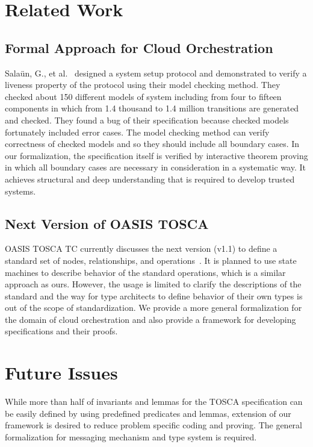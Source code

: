 \documentclass[12pt]{report}
\begin{document}
\section{Related Work}
\subsection{Formal Approach for Cloud Orchestration}
Sala{\"u}n, G., et
al.~\cite{EtcheversCBP11,SalaunBCPEG13,SalaunEPBC13} designed a system
setup protocol and demonstrated to verify a liveness property of the
protocol using their model checking method. They checked about 150
different models of system including from four to fifteen components
in which from 1.4 thousand to 1.4 million transitions are generated
and checked. They found a bug of their specification because checked
models fortunately included error cases. The model checking method can
verify correctness of checked models and so they should include all
boundary cases. In our formalization, the specification itself is
verified by interactive theorem proving in which all boundary cases
are necessary in consideration in a systematic way. It achieves
structural and deep understanding that is required to develop trusted
systems.

\subsection{Next Version of OASIS TOSCA}
OASIS TOSCA TC currently discusses the next version (v1.1) to define a
standard set of nodes, relationships, and
operations~\cite{TOSCAYAML}. It is planned to use state machines to
describe behavior of the standard operations, which is a similar
approach as ours. However, the usage is limited to clarify the
descriptions of the standard and the way for type architects to define
behavior of their own types is out of the scope of standardization. We
provide a more general formalization for the domain of cloud
orchestration and also provide a framework for developing
specifications and their proofs.

\section{Future Issues}
While more than half of invariants and lemmas for the TOSCA
specification can be easily defined by using predefined predicates and
lemmas, extension of our framework is desired to reduce problem
specific coding and proving. The general formalization for messaging
mechanism and type system is required.
\end{document}
